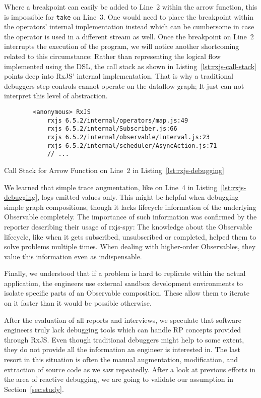 \documentclass[12pt,a4paper]{article}
\begin{document}
Where a breakpoint can easily be added to Line~2 within the arrow function, this is impossible for \texttt{take} on Line~3. One would need to place the breakpoint within the operators' internal implementation instead which can be cumbersome in case the operator is used in a different stream as well. Once the breakpoint on Line~2 interrupts the execution of the program, we will notice another shortcoming related to this circumstance: Rather than representing the logical flow implemented using the DSL, the call stack as shown in Listing~\ref{lst:rxjs-call-stack} points deep into RxJS' internal implementation. That is why a traditional debuggers step controls cannot operate on the dataflow graph; It just can not interpret this level of abstraction.

\begin{listing}[H]
	\begin{verbatim}
		<anonymous> RxJS
			rxjs 6.5.2/internal/operators/map.js:49
			rxjs 6.5.2/internal/Subscriber.js:66
			rxjs 6.5.2/internal/observable/interval.js:23
			rxjs 6.5.2/internal/scheduler/AsyncAction.js:71
			// ...
	\end{verbatim}
	\caption{Call Stack for Arrow Function on Line~2 in Listing~\ref{lst:rxjs-debugging}}
	\label{lst:rxjs-call-stack}
\end{listing}

We learned that simple trace augmentation, like on Line~4 in Listing~\ref{lst:rxjs-debugging}, logs emitted values only. This might be helpful when debugging simple graph compositions, though it lacks lifecycle information of the underlying Observable completely. The importance of such information was confirmed by the reporter describing their usage of rxjs-spy: The knowledge about the Observable lifecycle, like when it gets subscribed, unsubscribed or completed, helped them to solve problems multiple times. When dealing with higher-order Observables, they value this information even as indispensable.

Finally, we understood that if a problem is hard to replicate within the actual application, the engineers use external sandbox development environments to isolate specific parts of an Observable composition. These allow them to iterate on it faster than it would be possible otherwise.

After the evaluation of all reports and interviews, we speculate that software engineers truly lack debugging tools which can handle RP concepts provided through RxJS. Even though traditional debuggers might help to some extent, they do not provide all the information an engineer is interested in. The last resort in this situation is often the manual augmentation, modification, and extraction of source code as we saw repeatedly. After a look at previous efforts in the area of reactive debugging, we are going to validate our assumption in Section~\ref{sec:study}.
\end{document}
